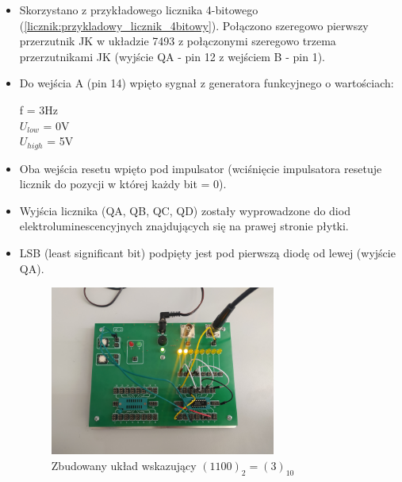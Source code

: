 \begin{itemize}
\begin{figure}[H]
\begin{subfigure}[H]{0.6\textwidth}
                \caption{Schemat logiczny 7493}
            \end{subfigure}
            \label{licznik_mod16:piny_schemat_logiczny}
        \end{figure}
    \item Skorzystano z przykładowego licznika 4-bitowego (\ref{licznik:przykladowy_licznik_4bitowy}). Połączono szeregowo pierwszy przerzutnik JK w układzie 7493 z połączonymi szeregowo trzema przerzutnikami JK (wyjście QA - pin 12 z wejściem B - pin 1).
    \item Do wejścia A (pin 14) wpięto sygnał z generatora funkcyjnego o wartościach:
        \begin{center}
            f = 3Hz \\
            $U_{low}$ = 0V \\
            $U_{high}$ = 5V
        \end{center}
    \item Oba wejścia resetu wpięto pod impulsator (wciśnięcie impulsatora resetuje licznik do pozycji w której każdy bit = 0).
    \item Wyjścia licznika (QA, QB, QC, QD) zostały wyprowadzone do diod elektroluminescencyjnych     znajdujących się na prawej stronie płytki.
    \item LSB (least significant bit) podpięty jest pod pierwszą diodę od lewej (wyjście QA).
        \begin{figure}[H]
            \centering
            \includegraphics[width=0.7\textwidth]{img/mod16/1653500524742_scaled.png}
            \caption{Zbudowany układ wskazujący $(1100)_2 = (3)_{10}$}
            \label{licznik_mod16:zbudowany_uklad}
        \end{figure}
        

\end{itemize}
